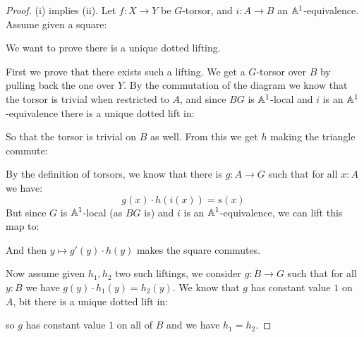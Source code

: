 \begin{proof}
(i) implies (ii). Let $f:X\to Y$ be $G$-torsor, and $i:A\to B$ an $\mathbb{A}^1$-equivalence. Assume given a square:
  \begin{center}
  \end{center}
  We want to prove there is a unique dotted lifting. 
  
  First we prove that there exists such a lifting. We get a $G$-torsor over $B$ by pulling back the one over $Y$. By the commutation of the diagram we know that the torsor is trivial when restricted to $A$, and since $BG$ is $\mathbb{A}^1$-local and $i$ is an $\mathbb{A}^1$-equivalence there is a unique dotted lift in:
    \begin{center}
  \end{center}
  So that the torsor is trivial on $B$ as well. From this we get $h$ making the triangle commute:
    \begin{center}
  \end{center}
  By the definition of torsors, we know that there is $g:A\to G$ such that for all $x:A$ we have:
  \[g(x)\cdot h(i(x)) = s(x)\]
  But since $G$ is $\mathbb{A}^1$-local (as $BG$ is) and $i$ is an $\mathbb{A}^1$-equivalence, we can lift this map to:
    \begin{center}
  \end{center}
  And then $y\mapsto g'(y)\cdot h(y)$ makes the square commutes.
  
  Now assume given $h_1,h_2$ two such liftings, we consider $g:B\to G$ such that for all $y:B$ we have $g(y)\cdot h_1(y) = h_2(y)$. We know that $g$ has constant value $1$ on $A$, bit there is a unique dotted lift in:
      \begin{center}
  \end{center}
  so $g$ has constant value $1$ on all of $B$ and we have $h_1=h_2$.
  

\end{proof}
